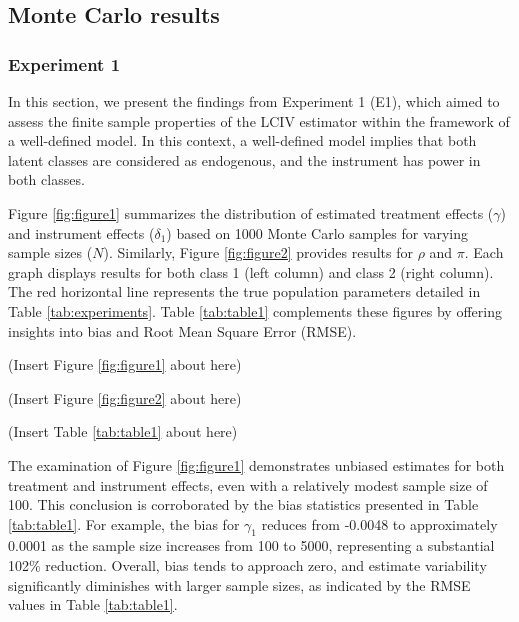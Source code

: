 \documentclass[12pt]{article}
\begin{document}
\subsection{Monte Carlo results}

\subsubsection{Experiment 1}

In this section, we present the findings from Experiment 1 (E1), which aimed to assess the finite sample properties of the LCIV estimator within the framework of a well-defined model. In this context, a well-defined model implies that both latent classes are considered as endogenous, and the instrument has power in both classes.

Figure \ref{fig:figure1} summarizes the distribution of estimated treatment effects ($\gamma$) and instrument effects ($\delta_1$) based on 1000 Monte Carlo samples for varying sample sizes ($N$). Similarly, Figure \ref{fig:figure2} provides results for $\rho$ and $\pi$. Each graph displays results for both class 1 (left column) and class 2 (right column). The red horizontal line represents the true population parameters detailed in Table \ref{tab:experiments}. Table \ref{tab:table1} complements these figures by offering insights into bias and Root Mean Square Error (RMSE). 

\begin{center}
	(Insert Figure \ref{fig:figure1} about here)
\end{center}

\begin{center}
	(Insert Figure \ref{fig:figure2} about here)
\end{center}

\begin{center}
	(Insert Table \ref{tab:table1} about here)
\end{center}

The examination of Figure \ref{fig:figure1} demonstrates unbiased estimates for both treatment and instrument effects, even with a relatively modest sample size of 100. This conclusion is corroborated by the bias statistics presented in Table \ref{tab:table1}. For example, the bias for $\gamma_1$ reduces from -0.0048 to approximately 0.0001 as the sample size increases from 100 to 5000, representing a substantial 102\% reduction. Overall, bias tends to approach zero, and estimate variability significantly diminishes with larger sample sizes, as indicated by the RMSE values in Table \ref{tab:table1}. 
\end{document}
